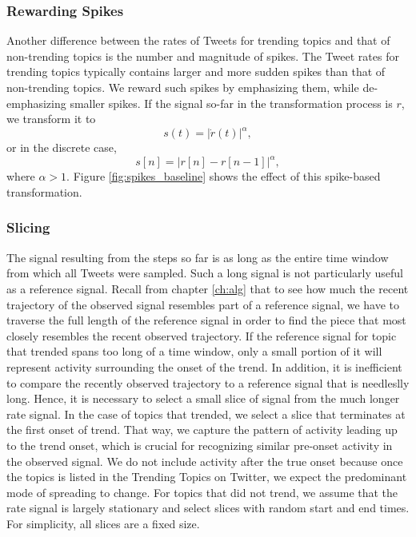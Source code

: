 \subsubsection{Rewarding Spikes}
Another difference between the rates of Tweets for trending topics and that of
non-trending topics is the number and magnitude of spikes. The Tweet rates for
trending topics typically contains larger and more sudden spikes than that of
non-trending topics. We reward such spikes by emphasizing them, while
de-emphasizing smaller spikes. If the signal so-far in the transformation
process is $r$, we transform it to \[ s(t) = |\dot{r}(t)|^{\alpha},\] or in the
discrete case, \[ s[n] = |r[n] - r[n-1]|^{\alpha},\] where $\alpha > 1$. Figure
\ref{fig:spikes_baseline} shows the effect of this spike-based transformation.

\subsubsection{Slicing}
The signal resulting from the steps so far is as long as the entire time window
from which all Tweets were sampled. Such a long signal is not particularly
useful as a reference signal. Recall from chapter \ref{ch:alg} that to see how
much the recent trajectory of the observed signal resembles part of a reference
signal, we have to traverse the full length of the reference signal in order to
find the piece that most closely resembles the recent observed trajectory. If
the reference signal for topic that trended spans too long of a time window,
only a small portion of it will represent activity surrounding the onset of the
trend. In addition, it is inefficient to compare the recently observed
trajectory to a reference signal that is needleslly long. Hence, it is necessary
to select a small slice of signal from the much longer rate signal. In the case
of topics that trended, we select a slice that terminates at the first onset of
trend. That way, we capture the pattern of activity leading up to the trend
onset, which is crucial for recognizing similar pre-onset activity in the
observed signal. We do not include activity after the true onset because once
the topics is listed in the Trending Topics on Twitter, we expect the
predominant mode of spreading to change. For topics that did not trend, we
assume that the rate signal is largely stationary and select slices with random
start and end times. For simplicity, all slices are a fixed size.

